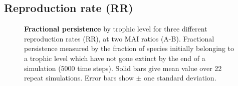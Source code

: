 \newpage
\subsection{Reproduction rate (RR)}
\label{sec:rr_v_p}

\begin{figure}
	\centering	
	\setlength{\subfloatlabelskip}{0pt}
	\caption{\textbf{Fractional persistence} by trophic level for three different reproduction rates (RR), at two MAI ratios (A-B). Fractional persistence measured by the fraction of species initially belonging to a trophic level which have not gone extinct by the end of a simulation (5000 time steps). Solid bars give mean value over 22 repeat simulations. Error bars show $\pm$ one standard deviation.}
	\label{fig:rr_histograms}
\end{figure}


